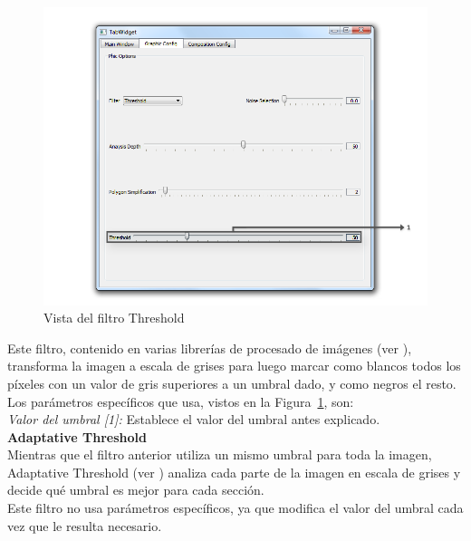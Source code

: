 		\begin{figure}[htbp]
		\centering
		\hspace*{-0.9in}
		\includegraphics[scale=0.57]{graphics/interfazthreshold.png}
		\caption{Vista del filtro Threshold}
		\label{fig:interfazthreshold}
		\end{figure}
		
		Este filtro, contenido en varias librerías de procesado de imágenes (ver \cite{opencvDoc}), transforma la imagen a escala de grises para luego marcar como blancos todos los píxeles con un valor de gris superiores a un umbral dado, y como negros el resto.\\
		
		Los parámetros específicos que usa, vistos en la Figura~\ref{fig:interfazthreshold}, son:\\		
		
		\noindent\textit{Valor del umbral [1]:} Establece el valor del umbral antes explicado.\\
		
	\noindent\textbf{Adaptative Threshold}\\

		Mientras que el filtro anterior utiliza un mismo umbral para toda la imagen, Adaptative Threshold (ver \cite{opencvDoc}) analiza cada parte de la imagen en escala de grises y decide qué umbral es mejor para cada sección.\\ 
		
		Este filtro no usa parámetros específicos, ya que modifica el valor del umbral cada vez que le resulta necesario.\\
		

